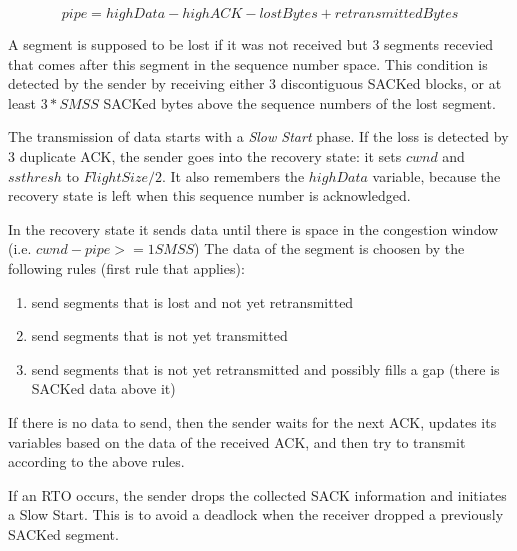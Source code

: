 $$ pipe = highData - highACK - lostBytes + retransmittedBytes $$

A segment is supposed to be lost if it was not received
but 3 segments recevied that comes after this segment in the sequence
number space.
This condition is detected by the sender by receiving
either 3 discontiguous SACKed blocks, or at least
$3*SMSS$ SACKed bytes above the sequence numbers of the
lost segment.

The transmission of data starts with a \emph{Slow Start} phase.
If the loss is detected by 3 duplicate ACK, the sender
goes into the recovery state: it sets
$cwnd$ and $ssthresh$ to $FlightSize / 2$.
It also remembers the $highData$ variable, because
the recovery state is left when this sequence number
is acknowledged.

In the recovery state it sends data
until there is space in the congestion window (i.e. $cwnd-pipe >= 1 SMSS$)
The data of the segment is choosen by the following rules (first rule that applies):

\begin{enumerate}
  \item send segments that is lost and not yet retransmitted
  \item send segments that is not yet transmitted
  \item send segments that is not yet retransmitted and possibly fills a gap
        (there is SACKed data above it)
\end{enumerate}

If there is no data to send, then the sender waits for the next ACK, updates
its variables based on the data of the received ACK, and then try to transmit
according to the above rules.

If an RTO occurs, the sender drops the collected SACK information and
initiates a Slow Start. This is to avoid a deadlock when the receiver
dropped a previously SACKed segment.

